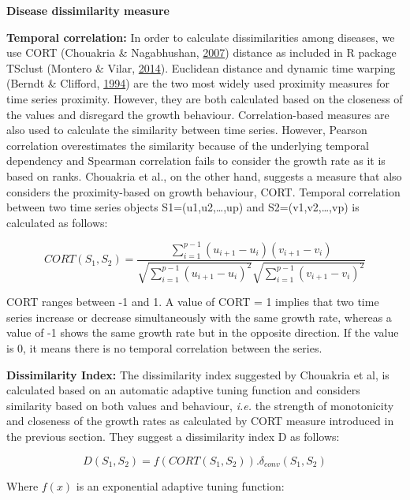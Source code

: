 \documentclass[12pt,twoside]{unicam}
\begin{document}
\textbf{Disease dissimilarity measure}

\textbf{Temporal correlation:} In order to calculate dissimilarities among diseases, we use CORT (Chouakria \& Nagabhushan, \protect\hyperlink{ref-Chouakria2007}{2007}) distance as included in R package TSclust (Montero \& Vilar, \protect\hyperlink{ref-Montero2014}{2014}). Euclidean distance and dynamic time warping (Berndt \& Clifford, \protect\hyperlink{ref-Berndt1994}{1994}) are the two most widely used proximity measures for time series proximity. However, they are both calculated based on the closeness of the values and disregard the growth behaviour. Correlation-based measures are also used to calculate the similarity between time series. However, Pearson correlation overestimates the similarity because of the underlying temporal dependency and Spearman correlation fails to consider the growth rate as it is based on ranks. Chouakria et al., on the other hand, suggests a measure that also considers the proximity-based on growth behaviour, CORT. Temporal correlation between two time series objects S1=(u1,u2,\ldots,up) and S2=(v1,v2,\ldots,vp) is calculated as follows:

\begin{equation}
    CORT(S_1,S_2) = \dfrac{\sum_{i=1}^{p-1}{(u_{i+1}-u_i)(v_{i+1}-v_i)}}{\sqrt{\sum_{i=1}^{p-1}{(u_{i+1}-u_i)^2}}\sqrt{\sum_{i=1}^{p-1}{(v_{i+1}-v_i)^2}}}
  \label{eq:discort}
\end{equation}

CORT ranges between -1 and 1. A value of CORT = 1 implies that two time series increase or decrease simultaneously with the same growth rate, whereas a value of -1 shows the same growth rate but in the opposite direction. If the value is 0, it means there is no temporal correlation between the series.

\textbf{Dissimilarity Index:} The dissimilarity index suggested by Chouakria et al, is calculated based on an automatic adaptive tuning function and considers similarity based on both values and behaviour, \emph{i.e.} the strength of monotonicity and closeness of the growth rates as calculated by CORT measure introduced in the previous section. They suggest a dissimilarity index D as follows:

\begin{equation}
    D(S_1,S_2)=f(CORT(S_1,S_2)).\delta_{conv}(S_1,S_2)
  \label{eq:disdissimilarity}
\end{equation}

Where \(f(x)\) is an exponential adaptive tuning function:
\end{document}

